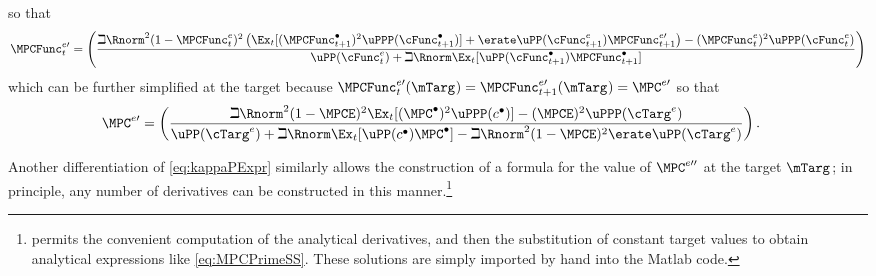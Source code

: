 \documentclass{\handout}
\begin{document}
so that
\begin{equation}\begin{gathered}\begin{aligned}
\MPCFunc^{e\prime}_{t}   & =  \left(\frac{\beth \Rnorm^{2} (1-\MPCFunc^{e}_{t})^{2} \left( \Ex_{t}[(\MPCFunc_{t+1}^{\bullet})^{2}\uPPP(\cFunc^{\bullet}_{t+1})] +\erate \uPP(\cFunc^{e}_{t+1}) \MPCFunc^{e \prime}_{t+1}\right)-(\MPCFunc^{e}_{t})^{2} \uPPP(\cFunc^{e}_{t})}{\uPP(\cFunc^{e}_{t})+\beth \Rnorm \Ex_{t}[\uPP(\cFunc^{\bullet}_{t+1})\MPCFunc^{\bullet}_{t+1}]  }\right) \nonumber \\ \label{eq:kappaPReverse}
\end{aligned}\end{gathered}\end{equation}
which can be further simplified at the target because $\MPCFunc^{e \prime}_{t}(\mTarg^{\null}) = \MPCFunc^{e \prime}_{t+1}(\mTarg^{\null}) = \MPC^{e \prime}$ so that
\begin{equation}\begin{gathered}\begin{aligned}
\MPC^{e\prime} & =  \left(\frac{\beth \Rnorm^{2} (1-\MPCE)^{2}\Ex_{t}[(\MPC^{\bullet})^{2} \uPPP(c^{\bullet})] -(\MPCE)^{2} \uPPP(\cTarg^{e})}{\uPP(\cTarg^{e}) + \beth \Rnorm \Ex_{t}[\uPP(c^{\bullet})\MPC^{\bullet}]- \beth \Rnorm^{2} (1-\MPCE)^{2}\erate \uPP(\cTarg^{e})}\right) \label{eq:MPCPrimeSS}
.
\end{aligned}\end{gathered}\end{equation}

Another differentiation of \eqref{eq:kappaPExpr} similarly allows the construction of a formula for the value of $\MPC^{e \prime\prime}$ at the target $\mTarg^{\null}$; in principle, any number of derivatives can be 
constructed in this manner.\footnote{\Mma permits the convenient computation of the analytical derivatives, and then the substitution of constant target values to obtain analytical expressions like \eqref{eq:MPCPrimeSS}.  These solutions are simply imported by hand into the Matlab code.}
\end{document}
